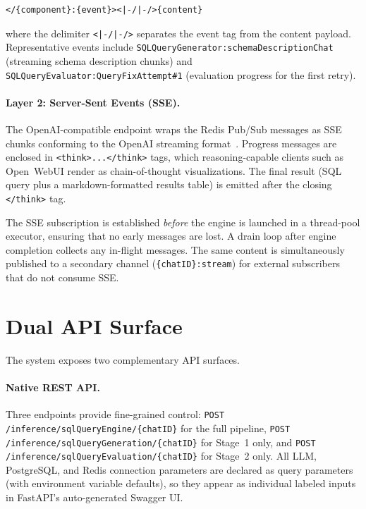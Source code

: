\documentclass{article}
\begin{document}
\begin{lstlisting}[basicstyle=\ttfamily\footnotesize, frame=single, breaklines=true]
</{component}:{event}><|-/|-/>{content}
\end{lstlisting}

\noindent where the delimiter \texttt{<|-/|-/>} separates the event tag from the content payload. Representative events include \texttt{SQLQueryGenerator:schemaDescriptionChat} (streaming schema description chunks) and \texttt{SQLQueryEvaluator:QueryFixAttempt\#1} (evaluation progress for the first retry).

\paragraph{Layer 2: Server-Sent Events (SSE).} The OpenAI-compatible endpoint wraps the Redis Pub/Sub messages as SSE chunks conforming to the OpenAI streaming format~\citep{hickson2015sse}. Progress messages are enclosed in \texttt{<think>...</think>} tags, which reasoning-capable clients such as Open~WebUI render as chain-of-thought visualizations. The final result (SQL query plus a markdown-formatted results table) is emitted after the closing \texttt{</think>} tag.

The SSE subscription is established \emph{before} the engine is launched in a thread-pool executor, ensuring that no early messages are lost. A drain loop after engine completion collects any in-flight messages. The same content is simultaneously published to a secondary channel (\texttt{\{chatID\}:stream}) for external subscribers that do not consume SSE.


\section{Dual API Surface}
\label{sec:api}

The system exposes two complementary API surfaces.

\paragraph{Native REST API.} Three endpoints provide fine-grained control: \texttt{POST /inference/sqlQueryEngine/\{chatID\}} for the full pipeline, \texttt{POST /inference/sqlQueryGeneration/\{chatID\}} for Stage~1 only, and \texttt{POST /inference/sqlQueryEvaluation/\{chatID\}} for Stage~2 only. All LLM, PostgreSQL, and Redis connection parameters are declared as query parameters (with environment variable defaults), so they appear as individual labeled inputs in FastAPI's auto-generated Swagger UI.
\end{document}
